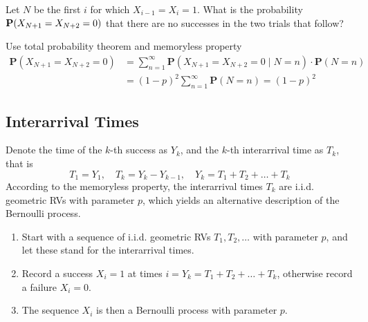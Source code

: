 \begin{example}
    Let $N$ be the first $i$ for which $X_{i-1} = X_i = 1$. What is the probability $\mathbf{P}\qty(X_{N+1} = X_{N+2} = 0)$ that there are no successes in the two trials that follow?
\end{example}
\begin{solution}
    Use total probability theorem and memoryless property
    \begin{equation}
    \begin{aligned}
        \mathbf{P}(X_{N+1} = X_{N+2} = 0) &= \sum_{n=1}^{\infty} \mathbf{P}(X_{N+1} = X_{N+2} = 0 \mid N = n) \cdot \mathbf{P}(N = n) \\ 
        &= (1 - p)^2 \sum_{n=1}^{\infty} \mathbf{P}(N = n) = (1 - p)^2
    \end{aligned}
    \end{equation}
\end{solution}

\subsection{Interarrival Times}
Denote the time of the $k$-th success as $Y_k$, and the $k$-th interarrival time as $T_k$, that is 
\begin{equation}
    T_1 = Y_1, \quad T_k = Y_k - Y_{k-1}, \quad Y_k = T_1 + T_2 + \ldots + T_k
\end{equation}
According to the memoryless property, the interarrival times $T_k$ are i.i.d. geometric RVs with parameter $p$, which yields an alternative description of the Bernoulli process.
\begin{definition}
    \begin{enumerate}
        \item Start with a sequence of i.i.d. geometric RVs $T_1, T_2, \ldots$ with parameter $p$, and let these stand for the interarrival times.
        \item Record a success $X_i = 1$ at times $i = Y_k = T_1 + T_2 + \ldots + T_k$, otherwise record a failure $X_i = 0$.
        \item The sequence $X_i$ is then a Bernoulli process with parameter $p$.
    \end{enumerate}
\end{definition}

